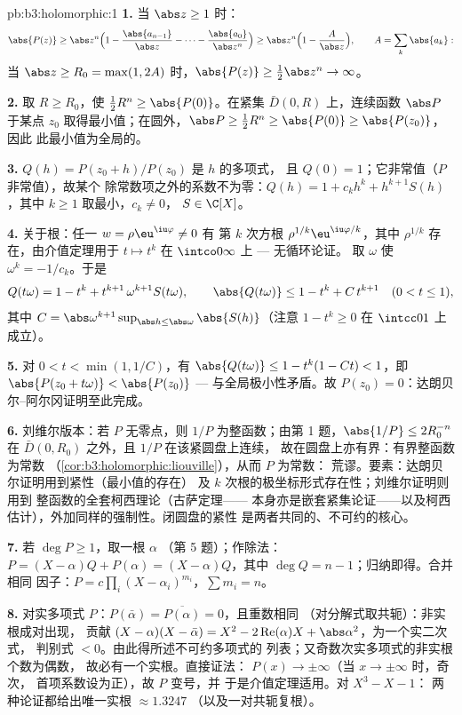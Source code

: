 \begin{solution}{pb:b3:holomorphic:1}
\textbf{1.} 当 $\abs z \geq 1$ 时：
\[
\abs{P(z)} \geq \abs z^n\Bigl(1 -
\frac{\abs{a_{n-1}}}{\abs z} - \dots -
\frac{\abs{a_0}}{\abs z^n}\Bigr)
\geq \abs z^n\Bigl(1 - \frac{A}{\abs z}\Bigr),
\qquad A = \sum_k\abs{a_k} :
\]
当 $\abs z \geq R_0 = \max(1, 2A)$ 时，$\abs{P(z)} \geq
\frac12\abs z^n \to \infty$。

\textbf{2.} 取 $R \geq R_0$，使 $\frac12R^n \geq
\abs{P(0)}$。在紧集 $\bar D(0, R)$ 上，连续函数
$\abs P$ 于某点 $z_0$ 取得最小值；在圆外，$\abs P
\geq \frac12R^n \geq \abs{P(0)} \geq \abs{P(z_0)}$，因此
此最小值为全局的。

\textbf{3.} $Q(h) = P(z_0 + h)/P(z_0)$ 是 $h$ 的多项式，
且 $Q(0) = 1$；它非常值（$P$ 非常值），故某个
除常数项之外的系数不为零：$Q(h) = 1 +
c_kh^k + h^{k+1}S(h)$，其中 $k \geq 1$ 取最小，$c_k \neq 0$，
$S \in \C[X]$。

\textbf{4.} 关于根：任一 $w = \rho\eu^{\iu\varphi} \neq 0$ 有
第 $k$ 次方根 $\rho^{1/k}\eu^{\iu\varphi/k}$，其中
$\rho^{1/k}$ 存在，由介值定理用于
$t \mapsto t^k$ 在 $\intco0\infty$ 上 --- 无循环论证。
取 $\omega$ 使 $\omega^k = -1/c_k$。于是
\[
Q(t\omega) = 1 - t^k + t^{k+1}\,\omega^{k+1}S(t\omega),
\qquad
\abs{Q(t\omega)} \leq 1 - t^k + C\,t^{k+1}
\quad (0 < t \leq 1),
\]
其中 $C = \abs\omega^{k+1}\sup_{\abs h \leq
\abs\omega}\abs{S(h)}$（注意 $1 - t^k \geq 0$ 在 $\intcc01$ 上成立）。

\textbf{5.} 对 $0 < t < \min(1, 1/C)$，有 $\abs{Q(t\omega)}
\leq 1 - t^k(1 - Ct) < 1$，即 $\abs{P(z_0 + t\omega)} <
\abs{P(z_0)}$ --- 与全局极小性矛盾。故
$P(z_0) = 0$：达朗贝尔--阿尔冈证明至此完成。

\textbf{6.} 刘维尔版本：若 $P$ 无零点，则 $1/P$
为整函数；由第 1 题，$\abs{1/P} \leq 2R_0^{-n}$ 在
$\bar D(0, R_0)$ 之外，且 $1/P$ 在该紧圆盘上连续，
故在圆盘上亦有界：有界整函数为常数
（\cref{cor:b3:holomorphic:liouville}），从而 $P$ 为常数：
荒谬。要素：达朗贝尔证明用到紧性（最小值的存在）
及 $k$ 次根的极坐标形式存在性；刘维尔证明则用到
整函数的全套柯西理论（古萨定理——
本身亦是嵌套紧集论证——以及柯西
估计），外加同样的强制性。闭圆盘的紧性
是两者共同的、不可约的核心。

\textbf{7.} 若 $\deg P \geq 1$，取一根 $\alpha$
（第 5 题）；作除法：$P = (X - \alpha)Q + P(\alpha) = (X -
\alpha)Q$，其中 $\deg Q = n - 1$；归纳即得。合并相同
因子：$P = c\prod_i(X - \alpha_i)^{m_i}$，$\sum m_i = n$。

\textbf{8.} 对实多项式 $P$：$P(\bar\alpha) =
\overline{P(\alpha)} = 0$，且重数相同
（对分解式取共轭）：非实根成对出现，
贡献 $(X - \alpha)(X - \bar\alpha) = X^2 -
2\operatorname{Re}(\alpha)X + \abs\alpha^2$，为一个实二次式，
判别式 $< 0$。由此得所述不可约多项式的
列表；又奇数次实多项式的非实根个数为偶数，
故必有一个实根。直接证法：
$P(x) \to \pm\infty$（当 $x \to \pm\infty$ 时，奇次，
首项系数设为正），故 $P$ 变号，并
于是介值定理适用。对 $X^3 - X - 1$：
两种论证都给出唯一实根 $\approx 1.3247$
（以及一对共轭复根）。


\end{solution}
